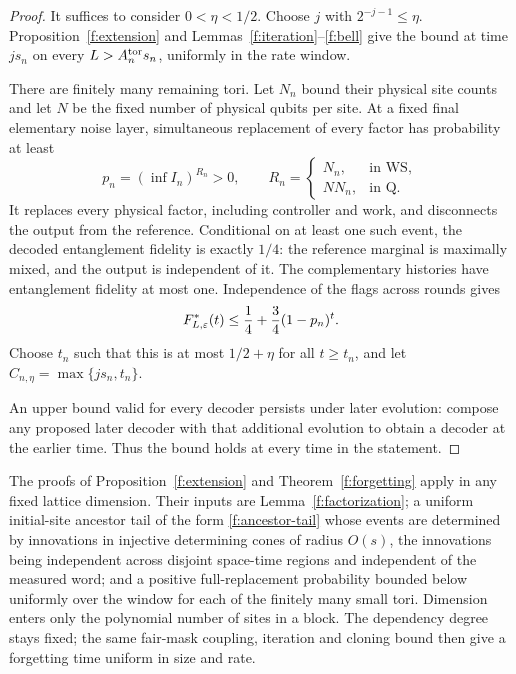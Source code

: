 \begin{proof}
It suffices to consider \(0<\eta<1/2\). Choose \(j\) with
\(2^{-j-1}\le\eta\). Proposition~\ref{f:extension} and
Lemmas~\ref{f:iteration}--\ref{f:bell} give the bound at time
\(js_n\) on every \(L>A^{\rm tor}_ns_n\), uniformly in the rate window.

There are finitely many remaining tori. Let \(N_n\) bound their
physical site counts and let \(N\) be the fixed number
of physical qubits per site. At a fixed final elementary noise layer,
simultaneous replacement of every factor has probability at least
\[
 p_n=(\inf I_n)^{R_n}>0,\qquad
 R_n=\begin{cases}N_n,&\text{in }\mathrm{WS},\\
 N N_n,&\text{in }\mathrm Q.\end{cases}
\]
It replaces every physical factor, including controller and work,
and disconnects the output from the reference. Conditional on at
least one such event, the decoded entanglement fidelity is exactly \(1/4\):
the reference marginal is maximally mixed, and the output is
independent of it. The complementary histories have entanglement fidelity at
most one. Independence of the flags across rounds gives
\[
 F^*_{L,\varepsilon}(t)\le\frac14+\frac34(1-p_n)^t.
\]
Choose \(t_n\) such that this is at most \(1/2+\eta\) for all \(t\ge t_n\), and let
\(C_{n,\eta}=\max\{js_n,t_n\}\).

An upper bound valid for every decoder persists under later
evolution: compose any proposed later decoder with that additional
evolution to obtain a decoder at the earlier time. Thus the bound
holds at every time in the statement.
\end{proof}

\begin{remark}\label{rem:forgetting-interface}
The proofs of Proposition~\ref{f:extension} and Theorem~\ref{f:forgetting} apply in any fixed lattice dimension. Their inputs are Lemma~\ref{f:factorization}; a uniform initial-site ancestor tail of the form \eqref{f:ancestor-tail} whose events are determined by innovations in injective determining cones of radius \(O(s)\), the innovations being independent across disjoint space-time regions and independent of the measured word; and a positive full-replacement probability bounded below uniformly over the window for each of the finitely many small tori. Dimension enters only the polynomial number of sites in a block. The dependency degree stays fixed; the same fair-mask coupling, iteration and cloning bound then give a forgetting time uniform in size and rate.
\end{remark}
